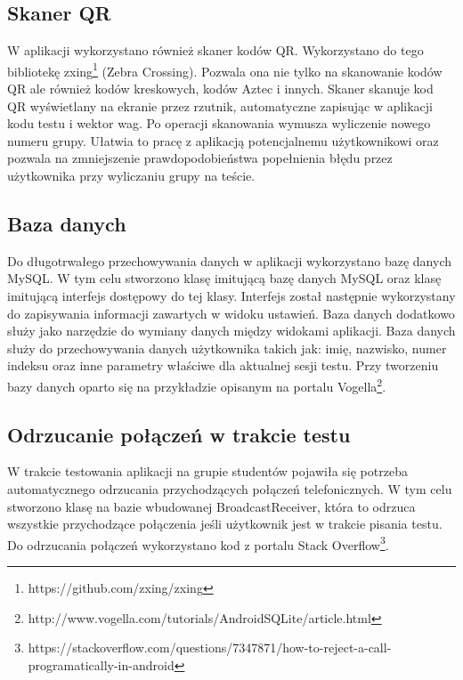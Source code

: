 \documentclass{report}
\begin{document}
			\subsection{Skaner QR}
			
			W aplikacji wykorzystano również skaner kodów QR. Wykorzystano do tego bibliotekę zxing\footnote{https://github.com/zxing/zxing} (Zebra Crossing). Pozwala ona nie tylko na skanowanie kodów QR ale również kodów kreskowych, kodów Aztec i innych. Skaner skanuje kod QR wyświetlany na ekranie przez rzutnik, automatyczne zapisując w aplikacji kodu testu i wektor wag. Po operacji skanowania wymusza wyliczenie nowego numeru grupy. Ułatwia to pracę z aplikacją potencjalnemu użytkownikowi oraz pozwala na zmniejszenie prawdopodobieństwa popełnienia błędu przez użytkownika przy wyliczaniu grupy na teście.
			
			\subsection{Baza danych}
			
			Do długotrwałego przechowywania danych w aplikacji wykorzystano bazę danych MySQL. W tym celu stworzono klasę imitującą bazę danych MySQL oraz klasę imitującą interfejs dostępowy do tej klasy. Interfejs został następnie wykorzystany do zapisywania informacji zawartych w widoku ustawień. Baza danych dodatkowo służy jako narzędzie do wymiany danych między widokami aplikacji. Baza danych służy do przechowywania danych użytkownika takich jak: imię, nazwisko, numer indeksu oraz inne parametry właściwe dla aktualnej sesji testu. Przy tworzeniu bazy danych oparto się na przykładzie opisanym na portalu Vogella\footnote{http://www.vogella.com/tutorials/AndroidSQLite/article.html}.
			
			\subsection{Odrzucanie połączeń w trakcie testu}
			
			W trakcie testowania aplikacji na grupie studentów pojawiła się potrzeba automatycznego odrzucania przychodzących połączeń telefonicznych. W tym celu stworzono klasę na bazie wbudowanej BroadcastReceiver, która to odrzuca wszystkie przychodzące połączenia jeśli użytkownik jest w trakcie pisania testu. Do odrzucania połączeń wykorzystano kod z portalu Stack Overflow\footnote{https://stackoverflow.com/questions/7347871/how-to-reject-a-call-programatically-in-android}.
			
\end{document}
